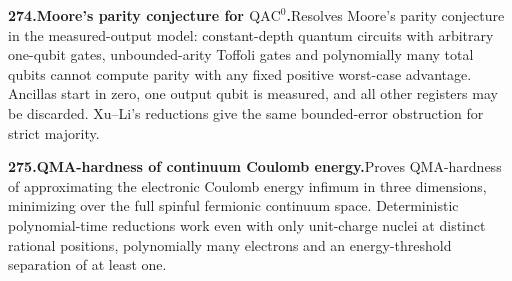 \documentclass[11pt,a4paper]{article}
\begin{document}
  \par \begin{minipage}{\linewidth}
  \fontsize{10.5}{12.6}\selectfont\RaggedRight
  \hypertarget{result 274}{}
  {\bfseries\textcolor{muted}{274.}\enspace Moore's parity conjecture for $\mathrm{QAC}^0$.}\enspace Resolves Moore's parity conjecture in the measured-output model: constant-depth quantum circuits with arbitrary one-qubit gates, unbounded-arity Toffoli gates and polynomially many total qubits cannot compute parity with any fixed positive worst-case advantage. Ancillas start in zero, one output qubit is measured, and all other registers may be discarded. Xu--Li's reductions give the same bounded-error obstruction for strict majority.\par
  \end{minipage}\par\vspace{5pt}



  \par \begin{minipage}{\linewidth}
  \fontsize{10.5}{12.6}\selectfont\RaggedRight
  \hypertarget{result 275}{}
  {\bfseries\textcolor{muted}{275.}\enspace QMA-hardness of continuum Coulomb energy.}\enspace Proves QMA-hardness of approximating the electronic Coulomb energy infimum in three dimensions, minimizing over the full spinful fermionic continuum space. Deterministic polynomial-time reductions work even with only unit-charge nuclei at distinct rational positions, polynomially many electrons and an energy-threshold separation of at least one.\par
  \end{minipage}\par\vspace{5pt}
\end{document}
